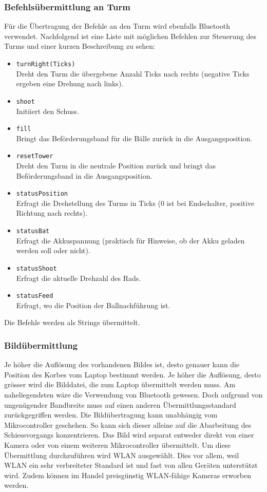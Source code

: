 \subsubsection{Befehlsübermittlung an Turm}
Für die Übertragung der Befehle an den Turm wird ebenfalls Bluetooth 
verwendet. Nachfolgend ist eine Liste mit möglichen Befehlen zur Steuerung des 
Turms und einer kurzen Beschreibung zu sehen:
\begin{itemize}
		\item \verb?turnRight(Ticks)?  \\
            Dreht den Turm die übergebene Anzahl Ticks nach rechts (negative 
            Ticks ergeben eine Drehung nach links). 
		\item \verb?shoot? \\
            Initiiert den Schuss. 
		\item \verb?fill? \\
            Bringt das Beförderungsband für die Bälle zurück in die 
            Ausgangsposition. 
		\item \verb?resetTower? \\
            Dreht den Turm in die neutrale Position zurück und bringt das 
            Beförderungsband in die Ausgangsposition. 
		\item \verb?statusPosition? \\
            Erfragt die Drehstellung des Turms in Ticks (0 ist bei 
            Endschalter, positive Richtung nach rechts). 
		\item \verb?statusBat? \\
            Erfragt die Akkuspannung (praktisch für Hinweise, ob der Akku 
            geladen werden soll oder nicht). 
		\item \verb?statusShoot? \\
            Erfragt die aktuelle Drehzahl des Rads. 
		\item \verb?statusFeed? \\
            Erfragt, wo die Position der Ballnachführung ist. 
	\end{itemize}
Die Befehle werden als Strings übermittelt.
\subsubsection{Bildübermittlung}
Je höher die Auflösung des vorhandenen Bildes ist, desto genauer kann die 
Position des Korbes vom Laptop bestimmt werden. Je höher die Auflösung, desto 
grösser wird die Bilddatei, die zum Laptop übermittelt werden muss. Am 
naheliegendsten wäre die Verwendung von Bluetooth gewesen. Doch aufgrund von 
ungenügender Bandbreite muss auf einen anderen Übermittlungsstandard 
zurückgegriffen werden. Die Bildübertragung kann unabhängig vom 
Mikrocontroller geschehen. So kann sich dieser alleine auf die Abarbeitung des 
Schiessvorgangs konzentrieren. Das Bild wird separat entweder direkt von einer 
Kamera oder von einem weiteren Mikrocontroller übermittelt. Um diese 
Übermittlung durchzuführen wird WLAN ausgewählt. Dies vor allem, weil WLAN ein 
sehr verbreiteter Standard ist und fast von allen Geräten unterstützt wird. 
Zudem können im Handel preisgünstig WLAN-fähige Kameras erworben werden.
